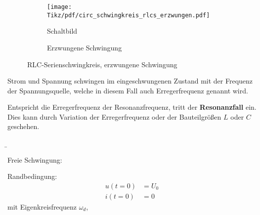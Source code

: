 \begin{frame}
{    \begin{figure}[H]\centering
        \begin{subfigure}{0.4\textwidth}\centering
            \texttt{[image: Tikz/pdf/circ\_schwingkreis\_rlcs\_erzwungen.pdf]}%
            \caption{Schaltbild}
            \label{fig:resonanzkreise:rlcs:erzwungen:circ}
        \end{subfigure}\hfill%
        \begin{subfigure}{0.58\textwidth}\centering
            \caption{Erzwungene Schwingung}
            \label{fig:resonanzkreise:rlcs:erzwungen:plot}
        \end{subfigure}
    \caption{RLC-Serienschwingkreis, erzwungene Schwingung}
    \label{fig:resonanzkreise:rlcs:erzwungen}
    \end{figure}

    Strom und Spannung schwingen im eingeschwungenen Zustand mit der Frequenz der Spannungsquelle, 
    welche in diesem Fall auch Erregerfrequenz genannt wird. 

    Entspricht die Erregerfrequenz der Resonanzfrequenz, tritt der \textbf{Resonanzfall} ein.
    Dies kann durch Variation der Erregerfrequenz oder der Bauteilgrößen $L$ oder $C$ geschehen.
}%
\b{%
\noindent\begin{minipage}[c][4cm][c]{\textwidth}\centering%
    \begin{minipage}[c][4cm][c]{0.25\textwidth}\centering%
    \end{minipage}\hfill%
    \begin{minipage}[c][4cm][c]{0.38\textwidth}\centering%
        Freie Schwingung:\newline
    \end{minipage}\hfill%
    \begin{minipage}[c][4cm][c]{0.35\textwidth}%
        Randbedingung:
        \begin{equation}\begin{aligned}
            u(t=0) &= U_0\\
            i(t=0) &= 0%
        \end{aligned}\end{equation}
        \quad mit Eigenkreisfrequenz $\omega_d$,


\end{minipage}
\end{minipage}}
\end{frame}
